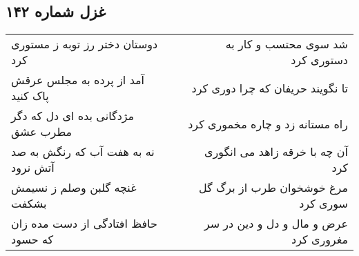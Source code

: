 \begin{center}
\section*{غزل شماره ۱۴۲}
\label{sec:sh142}
\begin{longtable}{l p{0.5cm} r}
دوستان دختر رز توبه ز مستوری کرد
&&
شد سوی محتسب و کار به دستوری کرد
\\
آمد از پرده به مجلس عرقش پاک کنید
&&
تا نگویند حریفان که چرا دوری کرد
\\
مژدگانی بده ای دل که دگر مطرب عشق
&&
راه مستانه زد و چاره مخموری کرد
\\
نه به هفت آب که رنگش به صد آتش نرود
&&
آن چه با خرقه زاهد می انگوری کرد
\\
غنچه گلبن وصلم ز نسیمش بشکفت
&&
مرغ خوشخوان طرب از برگ گل سوری کرد
\\
حافظ افتادگی از دست مده زان که حسود
&&
عرض و مال و دل و دین در سر مغروری کرد
\\
\end{longtable}
\end{center}
